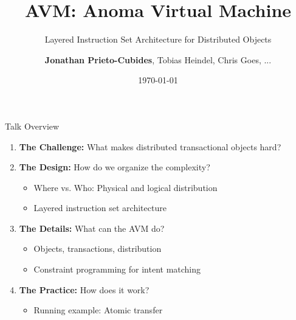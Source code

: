 \documentclass[handout,aspectratio=169,xcolor=dvipsnames,10pt]{beamer}
\title{AVM: Anoma Virtual Machine}
\subtitle{Layered Instruction Set Architecture for Distributed Objects}
\author{\textbf{Jonathan Prieto-Cubides}, Tobias Heindel, Chris Goes, ...}
\institute{Anoma Research — Heliax AG}
\date{\today}
\begin{document}
\begin{frame}
  \titlepage
\end{frame}


\begin{frame}{Talk Overview}

\vfill

\begin{enumerate}
  \item \textbf{The Challenge:} What makes distributed transactional objects hard?

  \vspace{0.5em}

  \item \textbf{The Design:} How do we organize the complexity?
  \begin{itemize}\small
    \item Where vs. Who: Physical and logical distribution
    \item Layered instruction set architecture
  \end{itemize}

  \vspace{0.5em}

  \item \textbf{The Details:} What can the AVM do?
  \begin{itemize}\small
    \item Objects, transactions, distribution
    \item Constraint programming for intent matching
  \end{itemize}

  \vspace{0.5em}

  \item \textbf{The Practice:} How does it work?
  \begin{itemize}\small
    \item Running example: Atomic transfer
  \end{itemize}

\end{enumerate}

\vfill

\end{frame}

\end{document}
